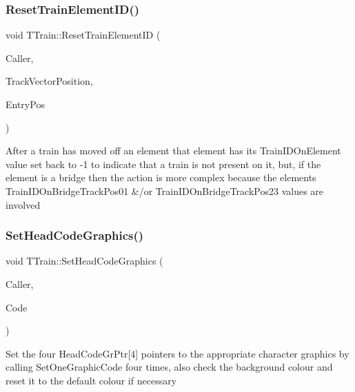 \subsubsection{\texorpdfstring{Reset\+Train\+Element\+I\+D()}{ResetTrainElementID()}}
{\footnotesize\ttfamily void T\+Train\+::\+Reset\+Train\+Element\+ID (\begin{DoxyParamCaption}\item[{int}]{Caller,  }\item[{unsigned int}]{Track\+Vector\+Position,  }\item[{int}]{Entry\+Pos }\end{DoxyParamCaption})\hspace{0.3cm}{\ttfamily [private]}}

After a train has moved off an element that element has its Train\+I\+D\+On\+Element value set back to -\/1 to indicate that a train is not present on it, but, if the element is a bridge then the action is more complex because the element\textquotesingle{}s Train\+I\+D\+On\+Bridge\+Track\+Pos01 \&/or Train\+I\+D\+On\+Bridge\+Track\+Pos23 values are involved \mbox{\label{class_t_train_a594228489e522dfde0ffbe124cd27103}} 
\subsubsection{\texorpdfstring{Set\+Head\+Code\+Graphics()}{SetHeadCodeGraphics()}}
{\footnotesize\ttfamily void T\+Train\+::\+Set\+Head\+Code\+Graphics (\begin{DoxyParamCaption}\item[{int}]{Caller,  }\item[{Ansi\+String}]{Code }\end{DoxyParamCaption})\hspace{0.3cm}{\ttfamily [private]}}

Set the four Head\+Code\+Gr\+Ptr\mbox{[}4\mbox{]} pointers to the appropriate character graphics by calling Set\+One\+Graphic\+Code four times, also check the background colour and reset it to the default colour if necessary \mbox{\label{class_t_train_a0e0ab54415645b04cbdeadd829d27898}} 
